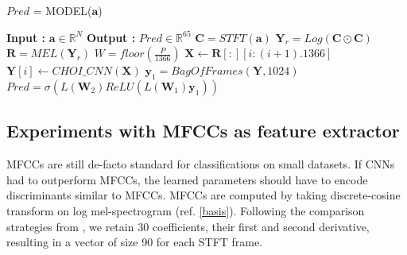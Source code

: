 \begin{algorithm}
  \caption{$Pred$ = MODEL($\textbf{a}$) }\label{alg:cnnbow}
  \begin{algorithmic}[1]
    \Statex \textbf{Input :} $\textbf{a} \in \mathbb{R}^{N}$
    \Statex \textbf{Output :} $Pred \in \mathbb{R}^{65}$ 
    \State $\textbf{C} = STFT(\textbf{a})$ 
    \State $\textbf{Y}_{r} = Log(\textbf{C} \odot \textbf{C})$ 
    \State $\textbf{R} = MEL(\textbf{Y}_{r})$ 
    \State $W = floor(\frac{P}{1366})$
      \State $\textbf{X} \leftarrow \textbf{R}[:][i:(i+1).1366]$ 
      \State $\textbf{Y}[i] \leftarrow CHOI\_CNN(\textbf{X})$  
    \EndFor
    \State $\textbf{y}_{1} = BagOfFrames(\textbf{Y},1024)$ 
     \State $Pred = \sigma(L(\textbf{W}_{2})ReLU(L(\textbf{W}_{1})\textbf{y}_{1}))$ 
  \end{algorithmic}
\end{algorithm}
\FloatBarrier
    
\subsection{Experiments with MFCCs as feature extractor}    
\label{mfcc}  
MFCCs are still de-facto standard for classifications on small datasets. If CNNs had to outperform MFCCs, the learned parameters should have to encode discriminants similar to MFCCs. MFCCs are computed by taking discrete-cosine transform on log mel-spectrogram (ref. \ref{basis}). Following the comparison strategies from \cite{choi_cnn}, we retain 30 coefficients, their first and second derivative, resulting in a vector of size 90 for each STFT frame.
\bigskip


